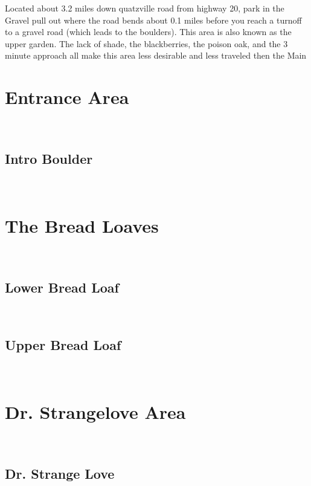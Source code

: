\begin{multicols}{2}
\begin{minipage}{\columnwidth}
Located about 3.2 miles down quatzville road from highway 20, park in the Gravel pull out where the road bends about 0.1 miles before you reach a turnoff to a gravel road (which leads to the boulders). This area is also known as the upper garden. The lack of shade, the blackberries, the poison oak, and the 3 minute approach all make this area less desirable and less traveled then the Main
\end{minipage}

\newpage
		\section{Entrance Area}\label{sa:Entrance Area}
	\begin{minipage}{\columnwidth}
	\
	\end{minipage}
			\subsection*{Intro Boulder}\label{bf:Intro Boulder}
			\begin{minipage}{\columnwidth}
			\
			\end{minipage}
			
\newpage
		\section{The Bread Loaves}\label{sa:The Bread Loaves}
	\begin{minipage}{\columnwidth}
	\
	\end{minipage}
			\subsection*{Lower Bread Loaf}\label{bf:Lower Bread Loaf}
			\begin{minipage}{\columnwidth}
			\
			\end{minipage}
			
			\subsection*{Upper Bread Loaf}\label{bf:Upper Bread Loaf}
			\begin{minipage}{\columnwidth}
			\
			\end{minipage}
			
\newpage
		\section{Dr. Strangelove Area}\label{sa:Dr. Strangelove Area}
	\begin{minipage}{\columnwidth}
	\
	\end{minipage}
			\subsection*{Dr. Strange Love}\label{bf:Dr. Strange Love}
			\begin{minipage}{\columnwidth}
			\
			\end{minipage}
			
\end{multicols}
\clearpage